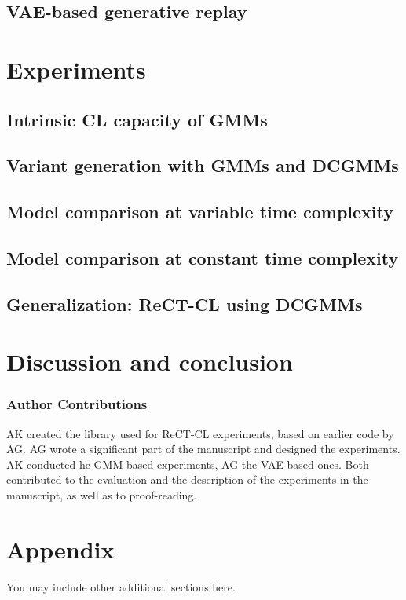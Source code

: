 \documentclass{article} %
\begin{document}
\subsection{VAE-based generative replay}


\section{Experiments}\label{sec:exp}
% 
\subsection{Intrinsic CL capacity of GMMs}
\subsection{Variant generation with GMMs and DCGMMs}
\subsection{Model comparison at variable time complexity}
\subsection{Model comparison at constant time complexity}
\subsection{Generalization: ReCT-CL using DCGMMs}

\section{Discussion and conclusion}
%
\subsubsection*{Author Contributions}
AK created the library used for ReCT-CL experiments, based on earlier code by AG. AG wrote a significant part of the manuscript and designed the experiments. AK conducted he GMM-based experiments, AG the VAE-based ones. Both contributed to the evaluation and the description of the experiments in the manuscript, as well as to proof-reading.
%
%



\appendix
\section{Appendix}
You may include other additional sections here.
\end{document}
